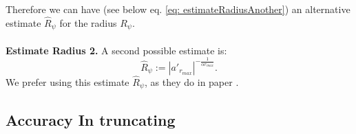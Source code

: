 \documentclass[a4paper,italian,11pt]{book}
\theoremstyle{plain}
\theoremstyle{remark}
\theoremstyle{plain}
\begin{document}
Therefore we can have (see below eq. \eqref{eq: estimateRadiusAnother}) an alternative estimate $\widehat{R}_\psi$ for the radius $R_\psi$.
\\
\\
\textbf{Estimate Radius 2.} A second possible estimate is:
\begin{equation}
    \label{eq: estimateRadiusAnother}
    \widehat{R}_\psi := |a'_{r_{max}}|^ {-\frac{1}{\alpha r_{max}}}.
\end{equation}
\noindent
We prefer using this estimate $\widehat{R}_\psi$, as they do in paper \cite{Main}.

\subsection{Accuracy In truncating}
\label{subsection: accuracy in truncating}
\end{document}
